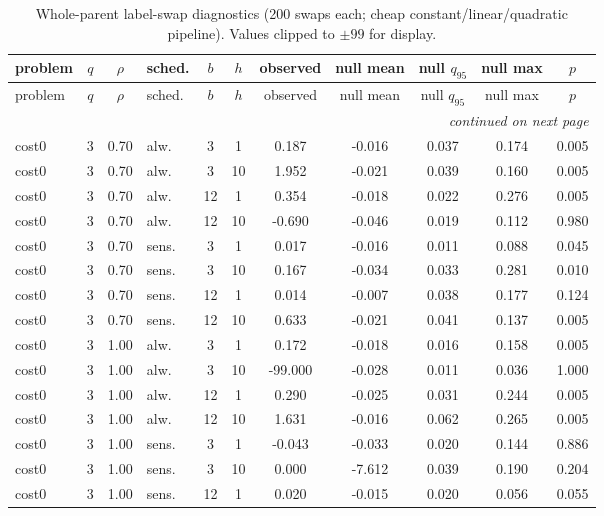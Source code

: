 \documentclass[10pt]{article}
\begin{document}
\begin{scriptsize}
\setlength{\tabcolsep}{3pt}
\begin{longtable}{l cclcc ccccc}
\caption{Whole-parent label-swap diagnostics (200 swaps each; cheap constant/linear/quadratic pipeline). Values clipped to $\pm99$ for display.}\label{tab:app-swaps}\\
\toprule
problem & $q$ & $\rho$ & sched. & $b$ & $h$ & observed & null mean & null $q_{95}$ & null max & $p$ \\
\midrule
\endfirsthead
\toprule
problem & $q$ & $\rho$ & sched. & $b$ & $h$ & observed & null mean & null $q_{95}$ & null max & $p$ \\
\midrule
\endhead
\midrule
\multicolumn{11}{r}{\emph{continued on next page}}\\
\endfoot
\bottomrule
\endlastfoot
cost0 & 3 & 0.70 & alw. & 3 & 1 & 0.187 & -0.016 & 0.037 & 0.174 & 0.005 \\
cost0 & 3 & 0.70 & alw. & 3 & 10 & 1.952 & -0.021 & 0.039 & 0.160 & 0.005 \\
cost0 & 3 & 0.70 & alw. & 12 & 1 & 0.354 & -0.018 & 0.022 & 0.276 & 0.005 \\
cost0 & 3 & 0.70 & alw. & 12 & 10 & -0.690 & -0.046 & 0.019 & 0.112 & 0.980 \\
cost0 & 3 & 0.70 & sens. & 3 & 1 & 0.017 & -0.016 & 0.011 & 0.088 & 0.045 \\
cost0 & 3 & 0.70 & sens. & 3 & 10 & 0.167 & -0.034 & 0.033 & 0.281 & 0.010 \\
cost0 & 3 & 0.70 & sens. & 12 & 1 & 0.014 & -0.007 & 0.038 & 0.177 & 0.124 \\
cost0 & 3 & 0.70 & sens. & 12 & 10 & 0.633 & -0.021 & 0.041 & 0.137 & 0.005 \\
cost0 & 3 & 1.00 & alw. & 3 & 1 & 0.172 & -0.018 & 0.016 & 0.158 & 0.005 \\
cost0 & 3 & 1.00 & alw. & 3 & 10 & -99.000 & -0.028 & 0.011 & 0.036 & 1.000 \\
cost0 & 3 & 1.00 & alw. & 12 & 1 & 0.290 & -0.025 & 0.031 & 0.244 & 0.005 \\
cost0 & 3 & 1.00 & alw. & 12 & 10 & 1.631 & -0.016 & 0.062 & 0.265 & 0.005 \\
cost0 & 3 & 1.00 & sens. & 3 & 1 & -0.043 & -0.033 & 0.020 & 0.144 & 0.886 \\
cost0 & 3 & 1.00 & sens. & 3 & 10 & 0.000 & -7.612 & 0.039 & 0.190 & 0.204 \\
cost0 & 3 & 1.00 & sens. & 12 & 1 & 0.020 & -0.015 & 0.020 & 0.056 & 0.055 \\

\end{longtable}
\end{scriptsize}
\end{document}
